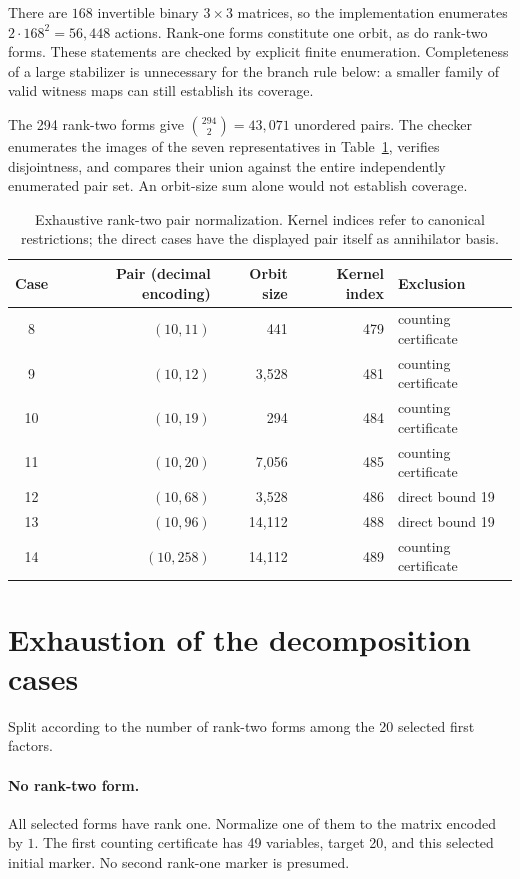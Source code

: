 \documentclass[11pt]{article}
\theoremstyle{definition}
\begin{document}
There are $168$ invertible binary $3\times3$ matrices, so the implementation enumerates $2\cdot168^2=56,448$ actions. Rank-one forms constitute one orbit, as do rank-two forms. These statements are checked by explicit finite enumeration. Completeness of a large stabilizer is unnecessary for the branch rule below: a smaller family of valid witness maps can still establish its coverage.

The 294 rank-two forms give $\binom{294}{2}=43,071$ unordered pairs. The checker enumerates the images of the seven representatives in Table~\ref{tab:orbits}, verifies disjointness, and compares their union against the entire independently enumerated pair set. An orbit-size sum alone would not establish coverage.

\begin{table}[ht]
\centering
\begin{tabular}{crrrl}
\toprule
Case & Pair (decimal encoding) & Orbit size & Kernel index & Exclusion \\
\midrule
8  & $(10,11)$  & 441    & 479 & counting certificate \\
9  & $(10,12)$  & 3,528  & 481 & counting certificate \\
10 & $(10,19)$  & 294    & 484 & counting certificate \\
11 & $(10,20)$  & 7,056  & 485 & counting certificate \\
12 & $(10,68)$  & 3,528  & 486 & direct bound 19 \\
13 & $(10,96)$  & 14,112 & 488 & direct bound 19 \\
14 & $(10,258)$ & 14,112 & 489 & counting certificate \\
\bottomrule
\end{tabular}
\caption{Exhaustive rank-two pair normalization. Kernel indices refer to canonical restrictions; the direct cases have the displayed pair itself as annihilator basis.}
\label{tab:orbits}
\end{table}

\section{Exhaustion of the decomposition cases}\label{sec:cases}
Split according to the number of rank-two forms among the 20 selected first factors.

\paragraph{No rank-two form.}
All selected forms have rank one. Normalize one of them to the matrix encoded by $1$. The first counting certificate has 49 variables, target 20, and this selected initial marker. No second rank-one marker is presumed.
\end{document}
